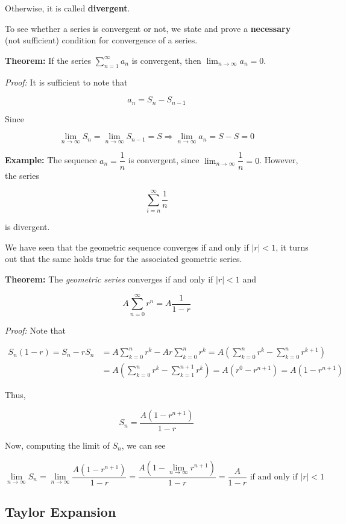 \documentclass[11pt]{article}
\begin{document}
{Otherwise, it is called \textbf{divergent}.

    To see whether a series is convergent or not, we state and prove a
\textbf{necessary} (not sufficient) condition for convergence of a
series.

\textbf{Theorem:} If the series \(\sum^{\infty}_{n=1} a_n\) is
convergent, then \(\lim_{n\rightarrow\infty}a_n = 0\).

\emph{Proof:} It is sufficient to note that

\[
a_n = S_{n} - S_{n-1}
\]

Since

\[
\lim_{n\rightarrow\infty}S_{n} = \lim_{n\rightarrow\infty}S_{n-1} = S \Rightarrow \lim_{n\rightarrow\infty}a_{n} = S - S = 0
\]

\textbf{Example:} The sequence \(a_n = \dfrac{1}{n}\) is convergent,
since \(\lim_{n\rightarrow\infty} \dfrac{1}{n} = 0\). However, the
series

\[
\sum^{\infty}_{i=n} \frac{1}{n}
\]

is divergent.

We have seen that the geometric sequence converges if and only if
\(\lvert r \rvert <1\), it turns out that the same holds true for the
associated geometric series.

\textbf{Theorem:} The \emph{geometric series} converges if and only if
\(\lvert r\rvert < 1\) and

\[
A\sum^{\infty}_{n=0} r^n = A\frac{1}{1-r}
\]

\emph{Proof:} Note that

\begin{align*}
S_n(1-r) = S_n - rS_n &= A\sum^n_{k=0}r^k - Ar\sum^{n}_{k=0} r^k = A\left(\sum^n_{k=0} r^k - \sum^n_{k=0} r^{k+1}\right) \\
&= A\left(\sum_{k=0}^n r^k - \sum^{n+1}_{k=1} r^k\right) =A\left( r^0 - r^{n+1}\right) = A\left(1-r^{n+1}\right)
\end{align*}

Thus,

\[
S_n = \frac{A\left(1-r^{n+1}\right)}{1-r}
\]

Now, computing the limit of \(S_n\), we can see

\[
\lim_{n\rightarrow\infty} S_n = \lim_{n\rightarrow\infty} \frac{A\left(1-r^{n+1}\right)}{1-r} = \frac{A\left(1 -  \displaystyle\lim_{n\rightarrow\infty} r^{n+1}\right)}{1-r} =  \frac{A}{1-r} \text{ if and only if }\lvert r \rvert < 1
\]

    \hypertarget{taylor-expansion}{%
\subsection{Taylor Expansion}\label{taylor-expansion}}

}
\end{document}
